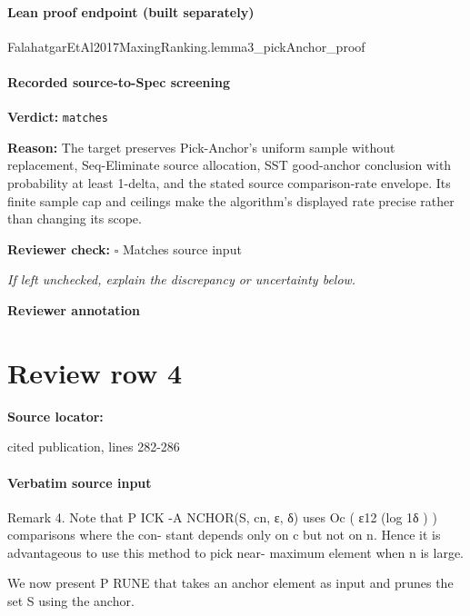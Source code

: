 \documentclass[10pt]{article}
\newcommand{\reviewerbox}{%
  \par\noindent\fbox{\parbox{0.96\linewidth}{\rule{0pt}{0.38in}}}\par
}
\newcommand{\reviewmatch}[1]{%
  \par\noindent\textbf{Reviewer check:} $\square$\; #1\par
  \noindent\emph{If left unchecked, explain the discrepancy or uncertainty below.}\par
}
\begin{document}
\paragraph{Lean proof endpoint (built separately)}\begin{ReviewVerbatim}
FalahatgarEtAl2017MaxingRanking.lemma3_pickAnchor_proof
\end{ReviewVerbatim}

\paragraph{Recorded source-to-Spec screening}
\textbf{Verdict:} \texttt{matches}
\\
{\raggedright
\textbf{Reason:} The target preserves Pick-\allowbreak{}Anchor's uniform sample without replacement, Seq-\allowbreak{}Eliminate source allocation, SST good-\allowbreak{}anchor conclusion with probability at least 1-\allowbreak{}delta, and the stated source comparison-\allowbreak{}rate envelope.\allowbreak{} Its finite sample cap and ceilings make the algorithm's displayed rate precise rather than changing its scope.\allowbreak{}
\par}
\reviewmatch{Matches source input}
\noindent\textbf{Reviewer annotation}\par
\reviewerbox
\clearpage
\hypertarget{source-claim-0c14b331a8d86299}{}
\section*{Review row 4}
\textbf{Source locator:} {\footnotesize\raggedright cited publication, lines 282-\allowbreak{}286\par}
\paragraph{Verbatim source input}
\begin{ReviewVerbatim}
Remark 4. Note that P ICK -A NCHOR(S, cn, ε, δ) uses Oc ( ε12 (log 1δ ) ) comparisons where the con-
stant depends only on c but not on n. Hence it is advantageous to use this method to pick near-
maximum element when n is large.

We now present P RUNE that takes an anchor element as input and prunes the set S using the anchor.
\end{ReviewVerbatim}
\end{document}
